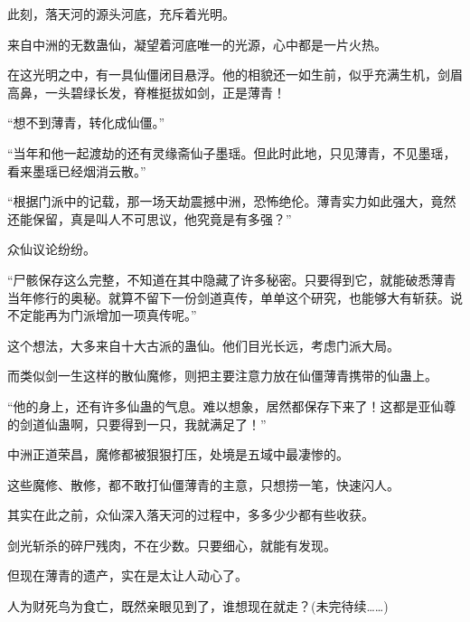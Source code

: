 \begin{this_body}
此刻，落天河的源头河底，充斥着光明。

来自中洲的无数蛊仙，凝望着河底唯一的光源，心中都是一片火热。

在这光明之中，有一具仙僵闭目悬浮。他的相貌还一如生前，似乎充满生机，剑眉高鼻，一头碧绿长发，脊椎挺拔如剑，正是薄青！

“想不到薄青，转化成仙僵。”

“当年和他一起渡劫的还有灵缘斋仙子墨瑶。但此时此地，只见薄青，不见墨瑶，看来墨瑶已经烟消云散。”

“根据门派中的记载，那一场天劫震撼中洲，恐怖绝伦。薄青实力如此强大，竟然还能保留，真是叫人不可思议，他究竟是有多强？”

众仙议论纷纷。

“尸骸保存这么完整，不知道在其中隐藏了许多秘密。只要得到它，就能破悉薄青当年修行的奥秘。就算不留下一份剑道真传，单单这个研究，也能够大有斩获。说不定能再为门派增加一项真传呢。”

这个想法，大多来自十大古派的蛊仙。他们目光长远，考虑门派大局。

而类似剑一生这样的散仙魔修，则把主要注意力放在仙僵薄青携带的仙蛊上。

“他的身上，还有许多仙蛊的气息。难以想象，居然都保存下来了！这都是亚仙尊的剑道仙蛊啊，只要得到一只，我就满足了！”

中洲正道荣昌，魔修都被狠狠打压，处境是五域中最凄惨的。

这些魔修、散修，都不敢打仙僵薄青的主意，只想捞一笔，快速闪人。

其实在此之前，众仙深入落天河的过程中，多多少少都有些收获。

剑光斩杀的碎尸残肉，不在少数。只要细心，就能有发现。

但现在薄青的遗产，实在是太让人动心了。

人为财死鸟为食亡，既然亲眼见到了，谁想现在就走？(未完待续……)

\end{this_body}


